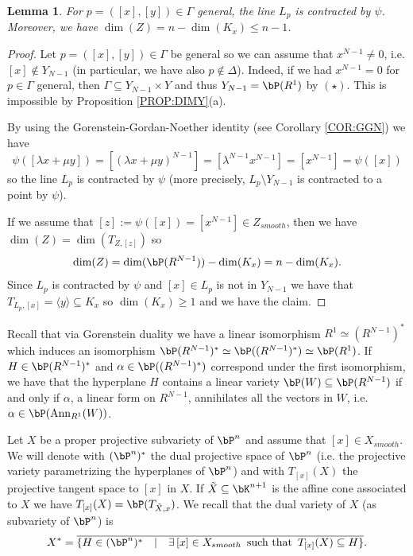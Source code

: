 \documentclass[a4paper,11pt]{amsart}
\newtheorem{lemma}[theorem]{Lemma}
\DeclareMathOperator{\Ann}{Ann}
\begin{document}
\begin{lemma}
For $p=([x],[y])\in \Gamma$ general, the line $L_p$ is contracted by $\psi$. Moreover, we have $\dim(Z)=n-\dim(K_x)\leq n-1$.
\end{lemma}
\begin{proof}
Let $p=([x],[y])\in \Gamma$ be general so we can assume that $x^{N-1}\neq 0$, i.e. $[x]\not\in Y_{N-1}$ (in particular, we have also $p\not \in \Delta$). Indeed, if we had $x^{N-1}=0$ for $p\in \Gamma$ general, then $\Gamma\subseteq Y_{N-1}\times Y$ and thus $Y_{N-1}=\bP(R^1)$ by $(\star)$. This is impossible by Proposition \ref{PROP:DIMY}(a). 

By using the Gorenstein-Gordan-Noether identity (see Corollary \ref{COR:GGN}) we have
$$\psi([\lambda x+\mu y])=[(\lambda x+\mu y)^{N-1}]=[\lambda^{N-1} x^{N-1}]=[x^{N-1}]=\psi([x])$$
so the line $L_p$ is contracted by $\psi$ (more precisely, $L_p\setminus Y_{N-1}$ is contracted to a point by $\psi$).
\vspace{2mm}

If we assume that $[z]:=\psi([x])=[x^{N-1}]\in Z_{smooth}$, then we have $\dim(Z)=\dim(T_{Z,[z]})$ so 
\begin{equation}
\label{EQ:DimZ}
\dim(Z)=\dim(\bP(R^{N-1}))-\dim(K_x)=n-\dim(K_x).
\end{equation}
Since $L_p$ is contracted by $\psi$ and $[x]\in L_p$ is not in $Y_{N-1}$ we have that $T_{L_p,[x]}=\langle y\rangle \subseteq K_x$ so $\dim(K_x)\geq 1$ and we have the claim.
\end{proof}

Recall that via Gorenstein duality we have a linear isomorphism $R^1\simeq (R^{N-1})^*$ which induces an isomorphism $\bP(R^{N-1})^*\simeq \bP((R^{N-1})^*)\simeq \bP(R^1)$. If $H\in \bP(R^{N-1})^*$ and $\alpha\in \bP((R^{N-1})^*)$ correspond under the first isomorphism, we have that the hyperplane $H$ contains a linear variety $\bP(W)\subseteq \bP(R^{N-1})$ if and only if $\alpha$, a linear form on $R^{N-1}$, annihilates all the vectors in $W$, i.e. $\alpha\in \bP(\Ann_{R^{1}}(W))$.
\vspace{2mm}

Let $X$ be a proper projective subvariety of $\bP^n$ and assume that $[x]\in X_{smooth}$. We will denote with $(\bP^n)^*$ the dual projective space of $\bP^n$ (i.e. the projective variety parametrizing the hyperplanes of $\bP^n$) and with $T_{[x]}(X)$ the projective tangent space to $[x]$ in $X$. If $\tilde{X}\subseteq \bK^{n+1}$ is the affine cone associated to $X$ we have $T_{[x]}(X)=\bP(T_{\tilde{X},x})$. We recall that the dual variety of $X$ (as subvariety of $\bP^n$) is
$$X^*=\overline{\{H\in (\bP^n)^*\quad |\quad \exists\, [x]\in X_{smooth}\, \mbox{ such that }\, T_{[x]}(X)\subseteq H\}}.$$
\end{document}
